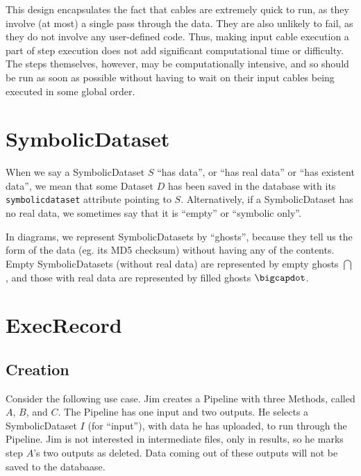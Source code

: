 \documentclass[12pt]{article}
\newcommand{\code}[1]{\texttt{#1}}
\newcommand{\sd}{\bigcap} %
\newcommand{\sdd}{\bigcapdot} %
\begin{document}
This design encapsulates the fact that cables are extremely quick to run, as
they involve (at most) a single pass through the data. They are also unlikely
to fail, as they do not involve any user-defined code. Thus, making input cable
execution a part of step execution does not add significant computational time
or difficulty. The steps themselves, however, may be computationally intensive,
and so should be run as soon as possible without having to wait on their input
cables being executed in some global order.

\section*{SymbolicDataset}

When we say a SymbolicDataset $S$ ``has data'', or ``has real data'' or ``has
existent data'', we mean that some Dataset $D$ has been saved in the database
with its \code{symbolicdataset} attribute pointing to $S$. Alternatively, if a
SymbolicDataset has no real data, we sometimes say that it is ``empty'' or
``symbolic only''.

In diagrams, we represent SymbolicDatasets by ``ghosts'', because they tell us
the form of the data (eg. its MD5 checksum) without having any of the contents.
Empty SymbolicDatasets (without real data) are represented by empty ghosts
$\sd$, and those with real data are represented by filled ghosts $\sdd$.

\section*{ExecRecord}

\subsection*{Creation}

Consider the following use case. Jim creates a Pipeline with three Methods,
called $A$, $B$, and $C$. The Pipeline has one input and two outputs. He
selects a SymbolicDataset $I$ (for ``input''), with data he has uploaded, to
run through the Pipeline. Jim is not interested in intermediate files, only in
results, so he marks step $A$'s two outputs as deleted. Data coming out of
these outputs will not be saved to the databaase.
\end{document}

